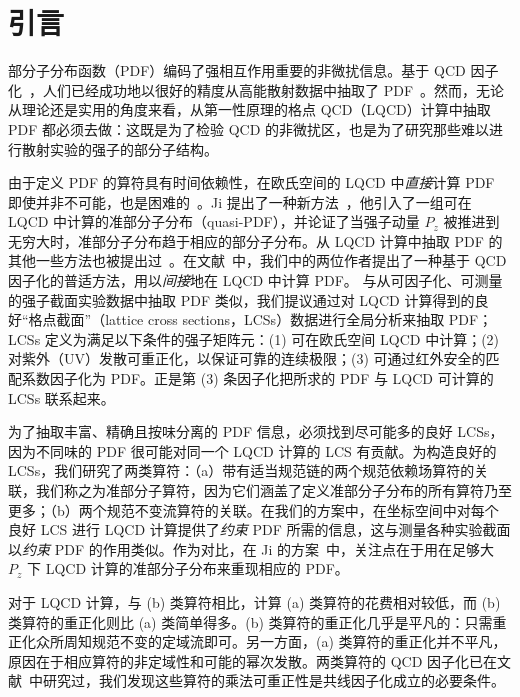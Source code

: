 \section{引言}
\label{sec:intro}
部分子分布函数（PDF）编码了强相互作用重要的非微扰信息。基于 QCD 因子化~\cite{Collins:1989gx}，人们已经成功地以很好的精度从高能散射数据中抽取了 PDF~\cite{Lin:2017snn}。然而，无论从理论还是实用的角度来看，从第一性原理的格点 QCD（LQCD）计算中抽取 PDF 都必须去做：这既是为了检验 QCD 的非微扰区，也是为了研究那些难以进行散射实验的强子的部分子结构。

由于定义 PDF 的算符具有时间依赖性，在欧氏空间的 LQCD 中{\it 直接}计算 PDF 即使并非不可能，也是困难的~\cite{Lin:2017snn}。Ji 提出了一种新方法~\cite{Ji:2013dva}，他引入了一组可在 LQCD 中计算的准部分子分布（quasi-PDF），并论证了当强子动量 $P_z$ 被推进到无穷大时，准部分子分布趋于相应的部分子分布。从 LQCD 计算中抽取 PDF 的其他一些方法也被提出过~\cite{Liu:1993cv,Liu:1999ak,Liu:2016djw,Orginos:2017kos,Chambers:2017dov}。在文献~\cite{Ma:2014jla,Ma:2017pxb}中，我们中的两位作者提出了一种基于 QCD 因子化的普适方法，用以\textit{间接}地在 LQCD 中计算 PDF。
与从可因子化、可测量的强子截面实验数据中抽取 PDF 类似，我们提议通过对 LQCD 计算得到的良好“格点截面”（lattice cross sections，LCSs）数据进行全局分析来抽取 PDF；LCSs 定义为满足以下条件的强子矩阵元：(1) 可在欧氏空间 LQCD 中计算；(2) 对紫外（UV）发散可重正化，以保证可靠的连续极限；(3) 可通过红外安全的匹配系数因子化为 PDF。正是第 (3) 条因子化把所求的 PDF 与 LQCD 可计算的 LCSs 联系起来。

为了抽取丰富、精确且按味分离的 PDF 信息，必须找到尽可能多的良好 LCSs，因为不同味的 PDF 很可能对同一个 LQCD 计算的 LCS 有贡献。为构造良好的 LCSs，我们研究了两类算符：（a）带有适当规范链的两个规范依赖场算符的关联，我们称之为准部分子算符，因为它们涵盖了定义准部分子分布的所有算符乃至更多；（b）两个规范不变流算符的关联。在我们的方案中，在坐标空间中对每个良好 LCS 进行 LQCD 计算提供了\textit{约束} PDF 所需的信息，这与测量各种实验截面以\textit{约束} PDF 的作用类似。作为对比，在 Ji 的方案~\cite{Ji:2013dva}中，关注点在于用在足够大 $P_z$ 下 LQCD 计算的准部分子分布来重现相应的 PDF。



对于 LQCD 计算，与 (b) 类算符相比，计算 (a) 类算符的花费相对较低，而 (b) 类算符的重正化则比 (a) 类简单得多。(b) 类算符的重正化几乎是平凡的：只需重正化众所周知规范不变的定域流即可。另一方面，(a) 类算符的重正化并不平凡，原因在于相应算符的非定域性和可能的幂次发散。两类算符的 QCD 因子化已在文献~\cite{Ma:2017pxb}中研究过，我们发现这些算符的乘法可重正性是共线因子化成立的必要条件。

